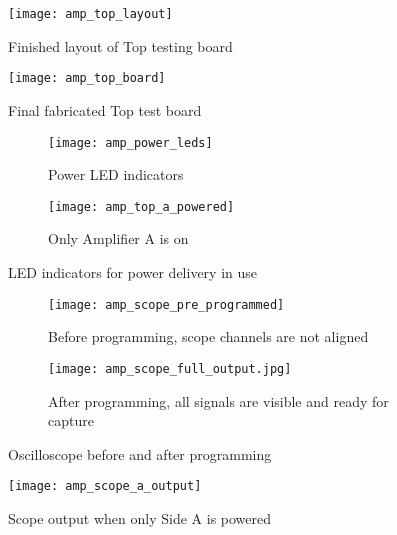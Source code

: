 \begin{figure}[!htb]
	\centering
	\texttt{[image: amp\_top\_layout]}
	\caption{Finished layout of Top testing board}
\end{figure}

\begin{figure}[!htb]
	\centering
	\texttt{[image: amp\_top\_board]}
	\caption{Final fabricated Top test board}
\end{figure}

\begin{figure}[!htb]
	\centering
	\begin{subfigure}[b]{0.54\textwidth}
		\texttt{[image: amp\_power\_leds]}
		\caption{Power LED indicators}
		\centering
	\end{subfigure}
	\begin{subfigure}[b]{0.45\textwidth}
		\texttt{[image: amp\_top\_a\_powered]}
		\caption{Only Amplifier A is on}
	\end{subfigure}
	\caption{LED indicators for power delivery in use}
\end{figure}

\begin{figure}[!htb]
	\centering
	\begin{subfigure}[b]{0.49\textwidth}
		\texttt{[image: amp\_scope\_pre\_programmed]}
		\caption{Before programming, scope channels are not aligned}
	\end{subfigure}
	\begin{subfigure}[b]{0.49\textwidth}
		\texttt{[image: amp\_scope\_full\_output.jpg]}
		\caption{After programming, all signals are visible and ready for capture}
	\end{subfigure}
	\caption{Oscilloscope before and after programming}
\end{figure}

\begin{figure}[!htb]
	\centering
	\texttt{[image: amp\_scope\_a\_output]}
	\caption{Scope output when only Side A is powered}
	\centering
\end{figure}


